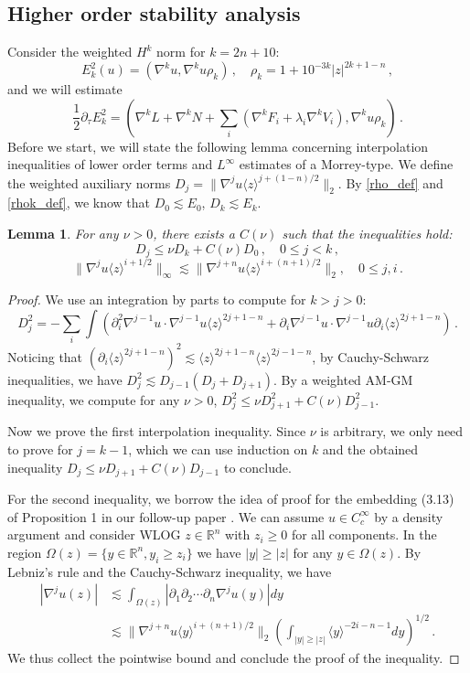 \documentclass[12pt]{caltech_thesis}
\newtheorem{lemma}[theorem]{Lemma}
\numberwithin{equation}{section}
\begin{document}
\subsection{Higher order stability analysis}
\label{hknorm}
Consider the weighted $H^k$ norm for $k=2n + 10$:
\begin{equation}\label{rhok_def}
    E^2_k(u)=(\nabla^ku,\nabla^ku\rho_k)\,,\quad \rho_k=1+10^{-3k}|z|^{2k+1-n}\,,
\end{equation} 
and we will estimate \begin{equation*}
    \frac{1}{2}\partial_\tau E^2_k=(\nabla^kL+\nabla^kN+\sum_i(\nabla^kF_i+\lambda _i\nabla^kV_i),\nabla^ku\rho_k)\,.
\end{equation*}
Before we start, we will state the following lemma concerning interpolation inequalities of lower order terms and $L^\infty$ estimates of a Morrey-type. We define the weighted auxiliary norms $D_j=\|\nabla^j u\langle z\rangle^{j+(1-n)/2}\|_{2}$. By \eqref{rho_def} and \eqref{rhok_def}, we know that $D_0\lesssim E_0$, $D_k\lesssim E_k$.
\begin{lemma}\label{lem:int}
    For any $\nu>0$, there exists a   $C(\nu)$ such that the inequalities hold:
    $$D_j\leq\nu D_k+C(\nu)D_0\,,\quad 0\leq j<k\,,$$
    $$\|\nabla^j u\langle z\rangle^{i+1/2}\|_{\infty}\lesssim\|\nabla^{j+n}{u}\langle z\rangle^{i+({n+1})/{2}}\|_2,\quad 0\leq j,i\,.$$
\end{lemma}
\begin{proof}
    We use an integration by parts to compute for $k>j>0$: $$D_j^2=-\sum_i\int(\partial_i^2\nabla^{j-1}u\cdot\nabla^{j-1}u\langle z\rangle^{2j+1-n}+\partial_i\nabla^{j-1}u\cdot\nabla^{j-1}u\partial_i\langle z\rangle^{2j+1-n})\,.$$
    Noticing that $(\partial_i\langle z\rangle^{2j+1-n})^2\lesssim\langle z\rangle^{2j+1-n}\langle z\rangle^{2j-1-n}$, by Cauchy-Schwarz inequalities, we have 
    $D_j^2\lesssim D_{j-1}(D_{j}+D_{j+1})$.
    By a weighted AM-GM inequality, we compute for any $\nu>0$, $D_j^2\leq\nu D^2_{j+1}+C(\nu)D^2_{j-1}$.

    Now we prove the first interpolation inequality. Since $\nu$ is arbitrary, we only need to prove for $j=k-1$, which we can use induction on $k$ and the obtained inequality $D_j\leq\nu D_{j+1}+C(\nu)D_{j-1}$ to conclude.

    For the second inequality, we borrow the idea of proof for the embedding (3.13) of Proposition 1  in our follow-up paper \cite{chen2024stability}. We can assume $u\in C^{\infty}_c$ by a density argument and consider WLOG $z\in\mathbb{R}^n$ with $z_i\geq0$ for all components. In the region $\Omega(z)=\{y\in\mathbb{R}^n,y_i\geq z_i\}$ we have $|y|\geq |z|$ for any $y\in\Omega(z)$. By Lebniz's rule and the Cauchy-Schwarz inequality, we have 
$$\begin{aligned}|\nabla^j{u}(z)|&\lesssim \int_{\Omega(z)}|\partial_1\partial_2\cdots\partial_n\nabla^j{u}(y)|dy\\&\lesssim \|\nabla^{j+n}{u}\langle y\rangle^{i+{(n+1)}/{2}}\|_2(\int_{|y|\geq |z|}\langle y\rangle^{-2i-n-1}dy)^{1/2}\,.\end{aligned}$$
    We thus collect the pointwise bound and conclude the proof of the inequality.
\end{proof}
\end{document}
